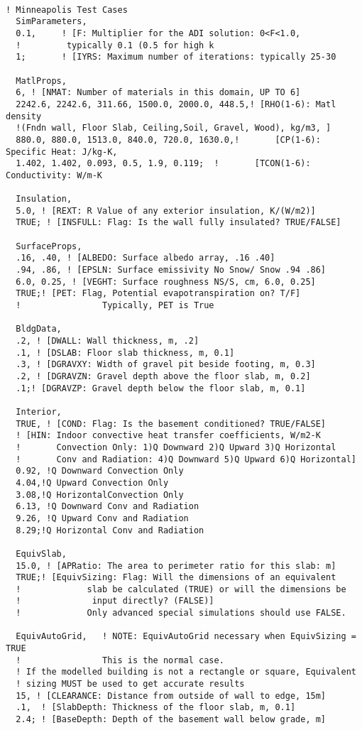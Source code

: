 \begin{lstlisting}

! Minneapolis Test Cases
  SimParameters,
  0.1,     ! [F: Multiplier for the ADI solution: 0<F<1.0,
  !         typically 0.1 (0.5 for high k
  1;       ! [IYRS: Maximum number of iterations: typically 25-30

  MatlProps,
  6, ! [NMAT: Number of materials in this domain, UP TO 6]
  2242.6, 2242.6, 311.66, 1500.0, 2000.0, 448.5,! [RHO(1-6): Matl density
  !(Fndn wall, Floor Slab, Ceiling,Soil, Gravel, Wood), kg/m3, ]
  880.0, 880.0, 1513.0, 840.0, 720.0, 1630.0,!       [CP(1-6): Specific Heat: J/kg-K,
  1.402, 1.402, 0.093, 0.5, 1.9, 0.119;  !       [TCON(1-6): Conductivity: W/m-K

  Insulation,
  5.0, ! [REXT: R Value of any exterior insulation, K/(W/m2)]
  TRUE; ! [INSFULL: Flag: Is the wall fully insulated? TRUE/FALSE]

  SurfaceProps,
  .16, .40, ! [ALBEDO: Surface albedo array, .16 .40]
  .94, .86, ! [EPSLN: Surface emissivity No Snow/ Snow .94 .86]
  6.0, 0.25, ! [VEGHT: Surface roughness NS/S, cm, 6.0, 0.25]
  TRUE;! [PET: Flag, Potential evapotranspiration on? T/F]
  !                Typically, PET is True

  BldgData,
  .2, ! [DWALL: Wall thickness, m, .2]
  .1, ! [DSLAB: Floor slab thickness, m, 0.1]
  .3, ! [DGRAVXY: Width of gravel pit beside footing, m, 0.3]
  .2, ! [DGRAVZN: Gravel depth above the floor slab, m, 0.2]
  .1;! [DGRAVZP: Gravel depth below the floor slab, m, 0.1]

  Interior,
  TRUE, ! [COND: Flag: Is the basement conditioned? TRUE/FALSE]
  ! [HIN: Indoor convective heat transfer coefficients, W/m2-K
  !       Convection Only: 1)Q Downward 2)Q Upward 3)Q Horizontal
  !       Conv and Radiation: 4)Q Downward 5)Q Upward 6)Q Horizontal]
  0.92, !Q Downward Convection Only
  4.04,!Q Upward Convection Only
  3.08,!Q HorizontalConvection Only
  6.13, !Q Downward Conv and Radiation
  9.26, !Q Upward Conv and Radiation
  8.29;!Q Horizontal Conv and Radiation

  EquivSlab,
  15.0, ! [APRatio: The area to perimeter ratio for this slab: m]
  TRUE;! [EquivSizing: Flag: Will the dimensions of an equivalent
  !             slab be calculated (TRUE) or will the dimensions be
  !              input directly? (FALSE)]
  !             Only advanced special simulations should use FALSE.

  EquivAutoGrid,   ! NOTE: EquivAutoGrid necessary when EquivSizing = TRUE
  !                This is the normal case.
  ! If the modelled building is not a rectangle or square, Equivalent
  ! sizing MUST be used to get accurate results
  15, ! [CLEARANCE: Distance from outside of wall to edge, 15m]
  .1,  ! [SlabDepth: Thickness of the floor slab, m, 0.1]
  2.4; ! [BaseDepth: Depth of the basement wall below grade, m]


\end{lstlisting}
